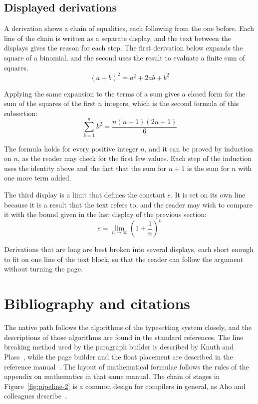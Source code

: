 \documentclass{article}
\begin{document}
\subsection{Displayed derivations}\label{sec:derivations-2}

A derivation shows a chain of equalities, each following from the one before. Each line
of the chain is written as a separate display, and the text between the displays gives
the reason for each step. The first derivation below expands the square of a binomial,
and the second uses the result to evaluate a finite sum of squares.
\[
  (a+b)^{2} = a^{2} + 2ab + b^{2}
\]

Applying the same expansion to the terms of a sum gives a closed form for the sum of the
squares of the first $n$ integers, which is the second formula of this subsection:
\[
  \sum_{k=1}^{n} k^{2} = \frac{n(n+1)(2n+1)}{6}
\]

The formula holds for every positive integer $n$, and it can be proved by induction on
$n$, as the reader may check for the first few values. Each step of the induction
uses the identity above and the fact that the sum for $n+1$ is the sum for $n$ with one
more term added.

The third display is a limit that defines the constant $e$. It is set on its own line
because it is a result that the text refers to, and the reader may wish to compare it
with the bound given in the last display of the previous section:
\[
  e = \lim_{n\to\infty} \left( 1 + \frac{1}{n} \right)^{n}
\]

Derivations that are long are best broken into several displays, each short enough to
fit on one line of the text block, so that the reader can follow the argument without
turning the page.

\section{Bibliography and citations}\label{sec:refs-2}

The native path follows the algorithms of the typesetting system closely, and the
descriptions of those algorithms are found in the standard references. The line
breaking method used by the paragraph builder is described by Knuth and
Plass~\cite{knuth81-2}, while the page builder and the float placement are described in
the reference manual~\cite{knuth86-2}. The layout of mathematical formulae follows the
rules of the appendix on mathematics in that same manual. The chain of stages in
Figure~\ref{fig:pipeline-2} is a common design for compilers in general, as Aho and
colleagues describe~\cite{aho06-2}.
\end{document}
